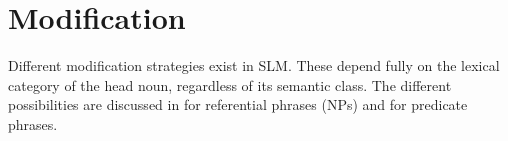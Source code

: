 %


\section{Modification}\label{sec:func:Modification}
Different modification strategies exist in SLM. These depend fully on the lexical category of the head noun, regardless of its semantic class. The different possibilities are   discussed in  for referential phrases (NPs) and  for predicate phrases.

